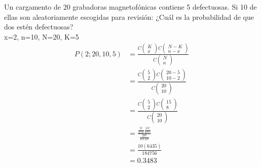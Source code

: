 \begin{ejemplo}
    Un cargamento de 20 grabadoras magnetofónicas contiene 5 defectuosas. Si 10 de ellas son aleatoriamente escogidas para revisión: ¿Cuál es la probabilidad de que dos estén defectuosas?\\
    x=2, n=10, N=20, K=5
    \begin{align*}
        P(2;20,10,5) & =\frac{C\left(\begin{matrix}
                K \\
                x
            \end{matrix}\right)C\left(\begin{matrix}
                N-K \\
                n-x
            \end{matrix}\right)}{C\left(\begin{matrix}
                N \\
                n
            \end{matrix}\right)}     \\
                     & = \frac{C\left(\begin{matrix}
                5 \\
                2
            \end{matrix}\right)C\left(\begin{matrix}
                20-5 \\
                10-2
            \end{matrix}\right)}{C\left(\begin{matrix}
                20 \\
                10
            \end{matrix}\right)}  \\
                     & = \frac{C\left(\begin{matrix}
                5 \\
                2
            \end{matrix}\right)C\left(\begin{matrix}
                15 \\
                8
            \end{matrix}\right)}{C\left(\begin{matrix}
                20 \\
                10
            \end{matrix}\right)} \\
                     & = \frac{\frac{5!}{2!3!}\frac{15!}{8!7!}}{\frac{20!}{10!10!}}                                                                        \\
                     & = \frac{10(6435)}{184756}                                                                                                           \\
                     & = 0.3483
    \end{align*}
\end{ejemplo}